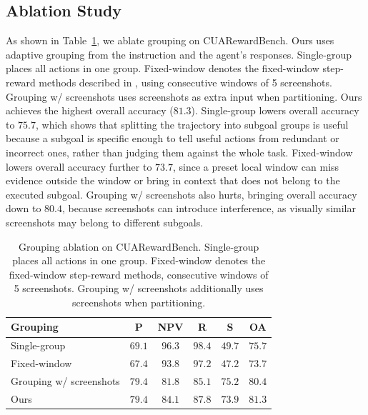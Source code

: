 \subsection{Ablation Study}
\label{sec:exp-ablation}

As shown in Table~\ref{tab:ablation-grouping}, we ablate grouping on CUARewardBench. Ours uses adaptive grouping from the instruction and the agent's responses. Single-group places all actions in one group. Fixed-window denotes the fixed-window step-reward methods described in , using consecutive windows of 5 screenshots. Grouping w/ screenshots uses screenshots as extra input when partitioning. Ours achieves the highest overall accuracy ($81.3$). Single-group lowers overall accuracy to $75.7$, which shows that splitting the trajectory into subgoal groups is useful because a subgoal is specific enough to tell useful actions from redundant or incorrect ones, rather than judging them against the whole task. Fixed-window lowers overall accuracy further to $73.7$, since a preset local window can miss evidence outside the window or bring in context that does not belong to the executed subgoal. Grouping w/ screenshots also hurts, bringing overall accuracy down to $80.4$, because screenshots can introduce interference, as visually similar screenshots may belong to different subgoals.

\begin{table}[t]
\caption{Grouping ablation on CUARewardBench. Single-group places all actions in one group. Fixed-window denotes the fixed-window step-reward methods, consecutive windows of 5 screenshots. Grouping w/ screenshots additionally uses screenshots when partitioning.}
\label{tab:ablation-grouping}
\centering
\small
\begin{tabular}{lccccc}
\toprule
Grouping & P & NPV & R & S & OA \\
\midrule
Single-group & $69.1$ & $\mathbf{96.3}$ & $\mathbf{98.4}$ & $49.7$ & $75.7$ \\
Fixed-window & $67.4$ & $93.8$ & $97.2$ & $47.2$ & $73.7$ \\
Grouping w/ screenshots & $\mathbf{79.4}$ & $81.8$ & $85.1$ & $\mathbf{75.2}$ & $80.4$ \\
Ours & $\mathbf{79.4}$ & $84.1$ & $87.8$ & $73.9$ & $\mathbf{81.3}$ \\
\bottomrule
\end{tabular}
\end{table}

